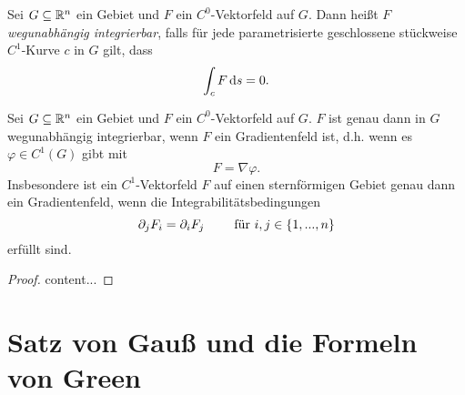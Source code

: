\documentclass[
pdftex,
oneside,
headsepline,
11pt, 
]{scrreprt}
\begin{document}
\begin{de}
	Sei $G\subseteq \mathbb{R}^n$ ein Gebiet und $F$ ein $C^0$-Vektorfeld auf $G$. Dann heißt $F$ \textit{wegunabhängig integrierbar}, falls für jede parametrisierte geschlossene stückweise $C^1$-Kurve $c$ in $G$ gilt, dass \[ \int_c F \mathop{}\!\mathrm{d} s=0. \]
\end{de}
\begin{theo}
	Sei $G\subseteq \mathbb{R}^n$ ein Gebiet und $F$ ein $C^0$-Vektorfeld auf $G$. $F$ ist genau dann in $G$ wegunabhängig integrierbar, wenn $F$ ein Gradientenfeld ist, d.h. wenn es $\varphi\in C^1(G)$ gibt mit \[ F=\nabla\varphi.\] Insbesondere ist ein $C^1$-Vektorfeld $F$ auf einen sternförmigen Gebiet genau dann ein Gradientenfeld, wenn die Integrabilitätsbedingungen \[ \partial_{j}F_i=\partial_iF_j \qquad \textnormal{ für } i,j\in\left\lbrace1,...,n\right\rbrace \] erfüllt sind.
\end{theo}
\begin{proof}
	content...
\end{proof}
\section{Satz von Gauß und die Formeln von Green}
\begin{de}
	\end{de}
\begin{de}[Randintegral im $\R^2$]
	
\end{de}
\begin{theo}
	
\end{theo}
\begin{de}
	
\end{de}
\begin{de}
	
\end{de}
\begin{theo}
	
\end{theo}
\begin{theo}
	
\end{theo}
\end{document}
